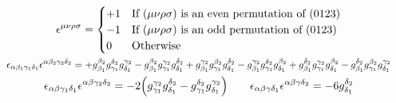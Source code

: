 \begin{gather*}
        \epsilon^{\mu\nu\rho\sigma} = \begin{cases}
                +1 &\text{If $(\mu\nu\rho\sigma)$ is an even permutation of $(0123)$} \\
                -1 &\text{If $(\mu\nu\rho\sigma)$ is an odd permutation of $(0123)$} \\
                0  &\text{Otherwise} \\
        \end{cases}
        \\
        \resizebox{\linewidth}{!}{$\displaystyle
                \epsilon_{\alpha\beta_1\gamma_1\delta_1}\epsilon^{\alpha\beta_2\gamma_2\delta_2}
                =
                + g^{\beta_2}_{\beta_1}g^{\delta_2}_{\gamma_1}g^{\gamma_2}_{\delta_1}
                - g^{\beta_2}_{\beta_1}g^{\gamma_2}_{\gamma_1}g^{\delta_2}_{\delta_1}
                + g^{\gamma_2}_{\beta_1}g^{\beta_2}_{\gamma_1}g^{\delta_2}_{\delta_1}
                - g^{\gamma_2}_{\beta_1}g^{\delta_2}_{\gamma_1}g^{\beta_2}_{\delta_1}
                + g^{\delta_2}_{\beta_1}g^{\gamma_2}_{\gamma_1}g^{\beta_2}_{\delta_1}
                - g^{\delta_2}_{\beta_1}g^{\beta_2}_{\gamma_1}g^{\gamma_2}_{\delta_1}
        $}
        \\
        \epsilon_{\alpha\beta\gamma_1\delta_1}\epsilon^{\alpha\beta\gamma_2\delta_2} = -2\qty(g_{\gamma_1}^{\gamma_2}g_{\delta_1}^{\delta_2} - g_{\gamma_1}^{\delta_2}g_{\delta_1}^{\gamma_2})
        \qquad
        \epsilon_{\alpha\beta\gamma\delta_1}\epsilon^{\alpha\beta\gamma\delta_2} = -6g_{\delta_1}^{\delta_2}
\end{gather*}

